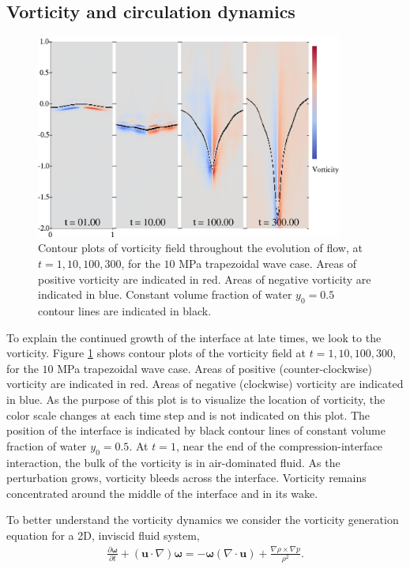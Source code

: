 \subsection{Vorticity and circulation dynamics}
\begin{figure}[h] 
  \centering
  \includegraphics[width=0.9\textwidth]{./figs/lung_figs/snapshots_vorticity_t1}
  \caption[The evolution of the vorticity] {Contour plots of vorticity
    field throughout the evolution of flow, at
    $t=1, 10, 100, 300$, for the $10$ MPa trapezoidal wave case. Areas
    of positive vorticity are indicated in red. Areas of negative
    vorticity are indicated in blue. Constant volume fraction of 
    water $y_0=0.5$ contour lines are indicated in black.}
  \label{fig:vorticity_snapshots}
\end{figure}
% 
To explain the continued growth of the interface at late times, we
look to the vorticity. Figure \ref{fig:vorticity_snapshots} shows
contour plots of the vorticity field at $t=1, 10, 100, 300$, for the
$10$ MPa trapezoidal wave case. Areas of positive (counter-clockwise)
vorticity are indicated in red. Areas of negative (clockwise)
vorticity are indicated in blue. As the purpose of this plot is to
visualize the location of vorticity, the color scale changes at each
time step and is not indicated on this plot. The position of the
interface is indicated by black contour lines of constant volume
fraction of water $y_0=0.5$. At $t=1$, near the end of the
compression-interface interaction, the bulk of the vorticity is in
air-dominated fluid. As the perturbation grows, vorticity bleeds
across the interface. Vorticity remains concentrated around the middle
of the interface and in its wake.

To better understand the vorticity dynamics we consider the vorticity
generation equation for a 2D, inviscid fluid system,
\begin{align} \label{eq:vorticity_euler}
  \frac{\partial \boldsymbol{\omega}}{\partial t}+\left(\boldsymbol{u}\cdot\nabla\right)\boldsymbol{\omega} =%
  - \boldsymbol{\omega}\left(\nabla\cdot\boldsymbol{u}\right) + \frac{\nabla\rho\times\nabla p}{\rho^2}.%
\end{align}

